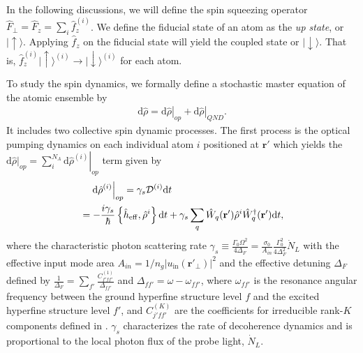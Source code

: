 \documentclass[preprint,aps,pra,onecolumn,superscriptaddress]{revtex4-1} %
\def\br{\mathbf{r}}
\def\ket#1{\lvert{#1}\rangle}%
\begin{document}
In the following discussions, we will define the spin squeezing operator $ \hat{F}_\perp=\hat{F}_z=\sum_i\hat{f}_z^{(i)} $. 
We define the fiducial state of an atom as the \textit{up state}, or $ \ket{\uparrow} $. 
Applying $ \hat{f}_z $ on the fiducial state will yield the coupled state or $ \ket{\downarrow} $.
That is, $ \hat{f}_z^{(i)}\ket{\uparrow}^{(i)}\rightarrow \ket{\downarrow}^{(i)} $ for each atom.

To study the spin dynamics, we formally define a stochastic master equation of the atomic ensemble by
\begin{align}\label{eq:totaldrhodt}
\mathrm{d}\hat{\rho}=\left.\mathrm{d}\hat{\rho}\right|_{op} + \left.\mathrm{d}\hat{\rho}\right|_{QND}.
\end{align}
It includes two collective spin dynamic processes. 
The first process is the optical pumping dynamics on each individual atom $i$ positioned at $\br'$ which yields the $\mathrm{d}\hat{\rho}|_{op}=\sum_i^{N_A} \left.\mathrm{d}\hat{\rho}^{(i)}\right|_{op} $ term given by
\begin{align}
&\quad\left.\mathrm{d}\hat{\rho}^{(i)}\right|_{op} =\gamma_s\mathcal{D}^{(i)}\mathrm{d}t\\
&= -\frac{i\gamma_s}{\hbar} \left\{\hat{h}_{\rm eff},\hat{\rho}^{i} \right\}\mathrm{d}t + \gamma_s\sum_q \hat{W}_q(\br')\hat{\rho}^{i}\hat{W}_q^\dagger(\br')\mathrm{d}t,
\end{align}
where the characteristic photon scattering rate $ \gamma_s\equiv \frac{\Gamma_0\Omega^2}{4\Delta_F}=\frac{\sigma_0}{A_{in}}\frac{\Gamma_0^2}{4\Delta_F^2}\dot{N}_L $ with the effective input mode area $ A_{in}=1/n_g|u_{\mathrm{in}}(\br'\!_\perp)|^2 $ and the effective detuning $ \Delta_F $ defined by $ \frac{1}{\Delta_F}=\sum_{f'}\frac{C_{f'ff'}^{(1)}}{\Delta_{ff'}} $ and $ \Delta_{ff'}=\omega-\omega_{ff'} $, where $ \omega_{ff'} $ is the resonance angular frequency between the ground hyperfine structure level $ f $ and the excited hyperfine structure level $ f' $, and $ C_{j'ff'}^{(K)} $ are the coefficients for irreducible rank-$K$ components defined in \cite{Deutsch2010a}.
$\gamma_s$ characterizes the rate of decoherence dynamics and is proportional to the local photon flux of the probe light, $ \dot{N}_L $.
\end{document}
